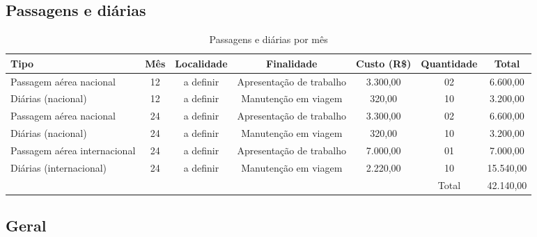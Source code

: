 \subsection{Passagens e diárias}
\begin{table}[!h]
\centering
	\caption{Passagens e diárias por mês}
\begin{tabular}{lcccccc}
\toprule
	Tipo                         & Mês & Localidade & Finalidade               & Custo (R\$) & Quantidade & Total    \\
	\midrule
	Passagem aérea nacional      & 12  & a definir  & Apresentação de trabalho & 3.300,00    & 02         &  6.600,00 \\
	Diárias (nacional)           & 12  & a definir  & Manutenção em viagem     &   320,00    & 10         &  3.200,00 \\
	Passagem aérea nacional      & 24  & a definir  & Apresentação de trabalho & 3.300,00    & 02         &  6.600,00 \\
	Diárias (nacional)           & 24  & a definir  & Manutenção em viagem     &   320,00    & 10         &  3.200,00 \\
	Passagem aérea internacional & 24  & a definir  & Apresentação de trabalho & 7.000,00    & 01         &  7.000,00 \\
	Diárias (internacional)      & 24  & a definir  & Manutenção em viagem     & 2.220,00    & 10         & 15.540,00 \\
\midrule
	                             &     &            &                          &             & Total      & 42.140,00 \\
\bottomrule
\end{tabular}
	\label{tab:viagem}
\end{table}
 
\subsection{Geral}

